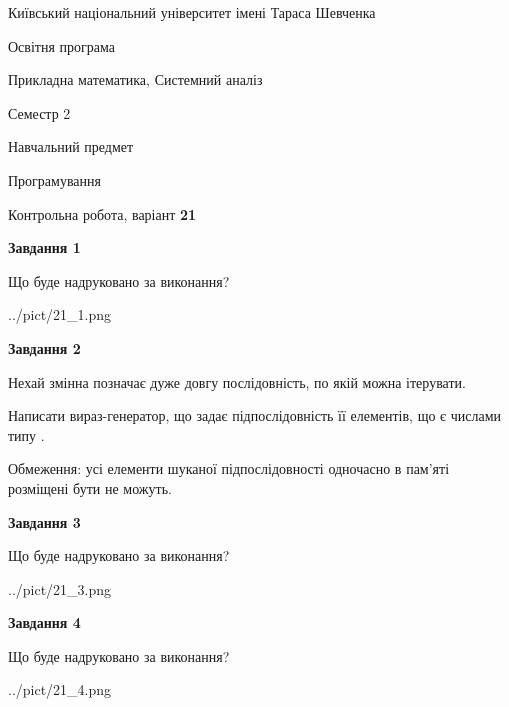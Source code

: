 \documentclass[12pt, ukrainian]{article}
\begin{document}
{{\begin {small}\par
{ \center  Київський національний університет імені Тараса Шевченка \par}
{\parbox {5 cm}{Освітня програма \hfill}{\parbox {8 cm}{Прикладна математика, Системний аналіз \hfill}}\parbox {5 cm}{\hfill Семестр 2}}\par
{\parbox {5 cm} {Навчальний предмет \hfill}\parbox {7 cm}{Програмування \hfill}\parbox {6cm}{\hfill}\par}\vspace{-7pt} \end{small}}{\center Контрольна робота, варіант  \No \textbf
{ 21 }\par}}
{
\begin {large}
{\begin {center}\textbf{Завдання 1}\end {center}}\par
Що буде надруковано за виконання?\par\par
\begin{center}
	{../pict/21_1.png}
\end{center}
\newpage

{\begin {center}\textbf{Завдання 2}\end {center}}\par
Нехай змінна  позначає дуже довгу послідовність, по якій можна ітерувати.

Написати вираз-генератор, що задає підпослідовність її елементів, що є числами типу .

Обмеження: усі елементи шуканої підпослідовності одночасно в пам'яті розміщені бути не можуть.\par
\newpage

{\begin {center}\textbf{Завдання 3}\end {center}}\par
Що буде надруковано за виконання?
\begin{center}
	{../pict/21_3.png}
\end{center}
\newpage

{\begin {center}\textbf{Завдання 4}\end {center}}\par
Що буде надруковано за виконання?\par
\begin{center}
	{../pict/21_4.png}
\end{center}
\newpage


\end{large}}
\end{document}
